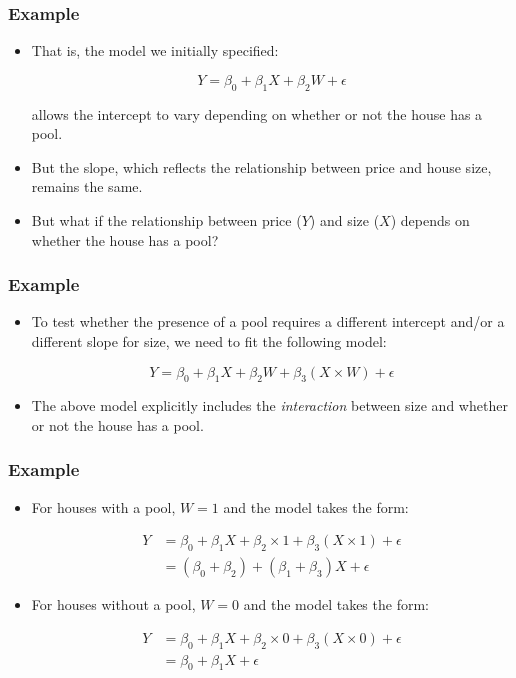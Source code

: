 \documentclass[14pt]{beamer}
\begin{document}
\begin{frame}
	\frametitle{Example}
	
	\begin{itemize}[label={\color{blue}$\blacktriangleright$}]
		\item That is, the model we initially specified:
		
		\[
		Y = \beta_0 + \beta_1X + \beta_2W + \epsilon
		\]
		
		allows the intercept to vary depending on whether or not the house has a pool.
		
		\item But the slope, which reflects the relationship between price and house size, remains the same.
		
		\item But what if the relationship between price ($Y$) and size ($X$) depends on whether the house has a pool?
	\end{itemize}
	
\end{frame}
\begin{frame}
	\frametitle{Example}
	
	\begin{itemize}[label={\color{blue}$\blacktriangleright$}]
		\item To test whether the presence of a pool requires a different intercept and/or a different slope for size, we need to fit the following model:
		
		\[
		Y = \beta_0 + \beta_1X + \beta_2W + \beta_3(X \times W) + \epsilon
		\]
		
		\item The above model explicitly includes the \textit{interaction} between size and whether or not the house has a pool.
	\end{itemize}
	
\end{frame}
\begin{frame}
	\frametitle{Example}
	
	\begin{itemize}[label={\color{blue}$\blacktriangleright$}]
		\item For houses with a pool, $W = 1$ and the model takes the form:
		
		\begin{align*}
			Y &= \beta_0 + \beta_1X + \beta_2 \times 1 + \beta_3(X \times 1) + \epsilon \\
			&= (\beta_0 + \beta_2) + (\beta_1 + \beta_3)X + \epsilon
		\end{align*}
		
		\item For houses without a pool, $W = 0$ and the model takes the form:
		
		\begin{align*}
			Y &= \beta_0 + \beta_1X + \beta_2 \times 0 + \beta_3(X \times 0) + \epsilon \\
			&= \beta_0 + \beta_1X + \epsilon
		\end{align*}
	\end{itemize}
	
\end{frame}
\end{document}
